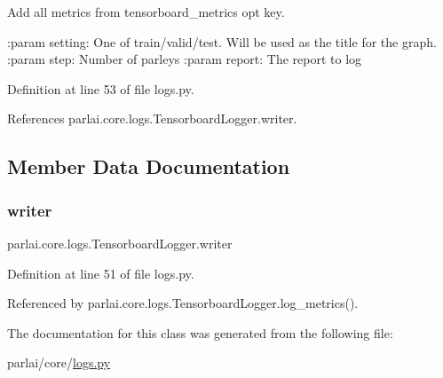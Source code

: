 \begin{DoxyVerb}Add all metrics from tensorboard_metrics opt key.

:param setting:
    One of train/valid/test. Will be used as the title for the graph.
:param step:
    Number of parleys
:param report:
    The report to log
\end{DoxyVerb}
 

Definition at line 53 of file logs.\+py.



References parlai.\+core.\+logs.\+Tensorboard\+Logger.\+writer.



\subsection{Member Data Documentation}
\mbox{\label{classparlai_1_1core_1_1logs_1_1TensorboardLogger_afc71d93e950d01b95fc824d347907a58}} 
\subsubsection{\texorpdfstring{writer}{writer}}
{\footnotesize\ttfamily parlai.\+core.\+logs.\+Tensorboard\+Logger.\+writer}



Definition at line 51 of file logs.\+py.



Referenced by parlai.\+core.\+logs.\+Tensorboard\+Logger.\+log\+\_\+metrics().



The documentation for this class was generated from the following file\+:\begin{DoxyCompactItemize}
\item 
parlai/core/\hyperlink{logs_8py}{logs.\+py}\end{DoxyCompactItemize}
